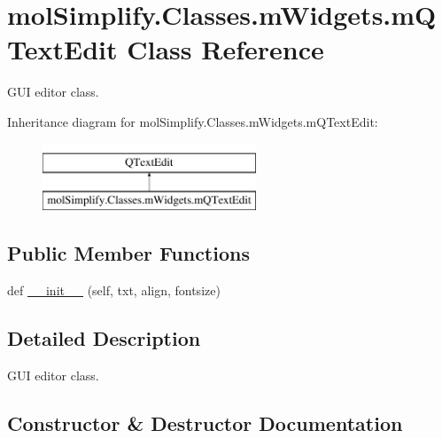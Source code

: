 \hypertarget{classmolSimplify_1_1Classes_1_1mWidgets_1_1mQTextEdit}{}\section{mol\+Simplify.\+Classes.\+m\+Widgets.\+m\+Q\+Text\+Edit Class Reference}
\label{classmolSimplify_1_1Classes_1_1mWidgets_1_1mQTextEdit}


G\+UI editor class.  


Inheritance diagram for mol\+Simplify.\+Classes.\+m\+Widgets.\+m\+Q\+Text\+Edit\+:\begin{figure}[H]
\begin{center}
\leavevmode
\includegraphics[height=2.000000cm]{classmolSimplify_1_1Classes_1_1mWidgets_1_1mQTextEdit}
\end{center}
\end{figure}
\subsection*{Public Member Functions}
\begin{DoxyCompactItemize}
\item 
def \hyperlink{classmolSimplify_1_1Classes_1_1mWidgets_1_1mQTextEdit_a5d753f694cc085bbdd6422bae4992abb}{\+\_\+\+\_\+init\+\_\+\+\_\+} (self, txt, align, fontsize)
\end{DoxyCompactItemize}


\subsection{Detailed Description}
G\+UI editor class. 

\subsection{Constructor \& Destructor Documentation}
\mbox{\label{classmolSimplify_1_1Classes_1_1mWidgets_1_1mQTextEdit_a5d753f694cc085bbdd6422bae4992abb}} 
